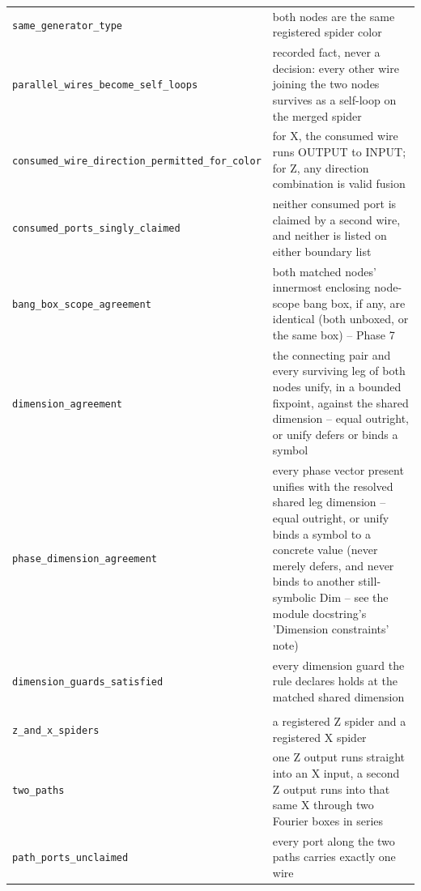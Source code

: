 \begin{xltabular}{\textwidth}{@{}>{\raggedright\arraybackslash}p{0.42\textwidth}>{\raggedright\arraybackslash}X@{}}
\quad\texttt{same\_\allowbreak{}generator\_\allowbreak{}type} & both nodes are the same registered spider color \\
\quad\texttt{parallel\_\allowbreak{}wires\_\allowbreak{}become\_\allowbreak{}self\_\allowbreak{}loops} & recorded fact, never a decision: every other wire joining the two nodes survives as a self-loop on the merged spider \\
\quad\texttt{consumed\_\allowbreak{}wire\_\allowbreak{}direction\_\allowbreak{}permitted\_\allowbreak{}for\_\allowbreak{}color} & for X, the consumed wire runs OUTPUT to INPUT; for Z, any direction combination is valid fusion \\
\quad\texttt{consumed\_\allowbreak{}ports\_\allowbreak{}singly\_\allowbreak{}claimed} & neither consumed port is claimed by a second wire, and neither is listed on either boundary list \\
\quad\texttt{bang\_\allowbreak{}box\_\allowbreak{}scope\_\allowbreak{}agreement} & both matched nodes' innermost enclosing node-scope bang box, if any, are identical (both unboxed, or the same box) -- Phase 7 \\
\quad\texttt{dimension\_\allowbreak{}agreement} & the connecting pair and every surviving leg of both nodes unify, in a bounded fixpoint, against the shared dimension -- equal outright, or unify defers or binds a symbol \\
\quad\texttt{phase\_\allowbreak{}dimension\_\allowbreak{}agreement} & every phase vector present unifies with the resolved shared leg dimension -- equal outright, or unify binds a symbol to a concrete value (never merely defers, and never binds to another still-symbolic Dim -- see the module docstring's 'Dimension constraints' note) \\
\quad\texttt{dimension\_\allowbreak{}guards\_\allowbreak{}satisfied} & every dimension guard the rule declares holds at the matched shared dimension \\
\midrule
{}\\
\quad\texttt{z\_\allowbreak{}and\_\allowbreak{}x\_\allowbreak{}spiders} & a registered Z spider and a registered X spider \\
\quad\texttt{two\_\allowbreak{}paths} & one Z output runs straight into an X input, a second Z output runs into that same X through two Fourier boxes in series \\
\quad\texttt{path\_\allowbreak{}ports\_\allowbreak{}unclaimed} & every port along the two paths carries exactly one wire \\

\end{xltabular}
